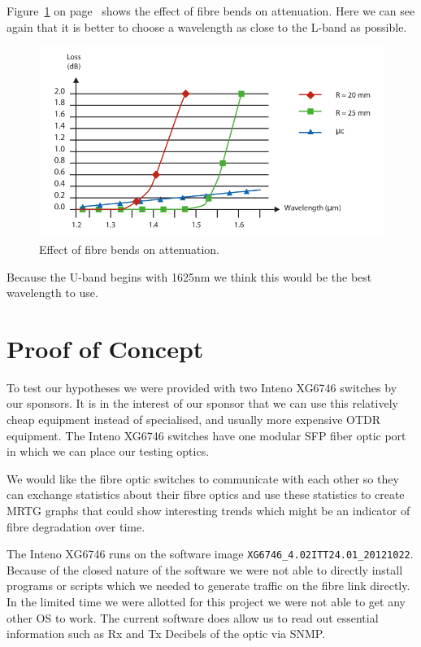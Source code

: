 \documentclass{article}
\begin{document}
Figure~\ref{fig:attenuation-bends} on page~\pageref{fig:attenuation-bends} shows the effect of fibre bends on attenuation. Here we can see again that it is better to choose a wavelength as close to the L-band as possible.
\begin{figure}[h]
\centerline{\includegraphics[scale=0.3, trim = 0mm 0mm 0mm 0mm]{images/attenuation-bends.png}}
\caption{Effect of fibre bends on attenuation.\cite[p. 27]{itu-t:manual2009}}
\label{fig:attenuation-bends}
\end{figure}

Because the U-band begins with 1625nm we think this would be the best wavelength to use.




\newpage
\section{Proof of Concept}
To test our hypotheses we were provided with two Inteno XG6746\cite{Inteno:XG6746} switches by our sponsors. It is in the interest of our sponsor that we can use this relatively cheap equipment instead of specialised, and usually more expensive OTDR equipment. The Inteno XG6746 switches have one modular SFP fiber optic port in which we can place our testing optics. 

We would like the fibre optic switches to communicate with each other so they can exchange statistics about their fibre optics and use these statistics to create MRTG\cite{MRTG:MRTG} graphs that could show interesting trends which might be an indicator of fibre degradation over time.

The Inteno XG6746 runs on the software image \texttt{XG6746\_4.02ITT24.01\_20121022}. Because of the closed nature of the software we were not able to directly install programs or scripts which we needed to generate traffic on the fibre link directly.
In the limited time we were allotted for this project we were not able to get any other OS to work. The current software does allow us to read out essential information such as Rx and Tx Decibels of the optic via SNMP.
\end{document}
